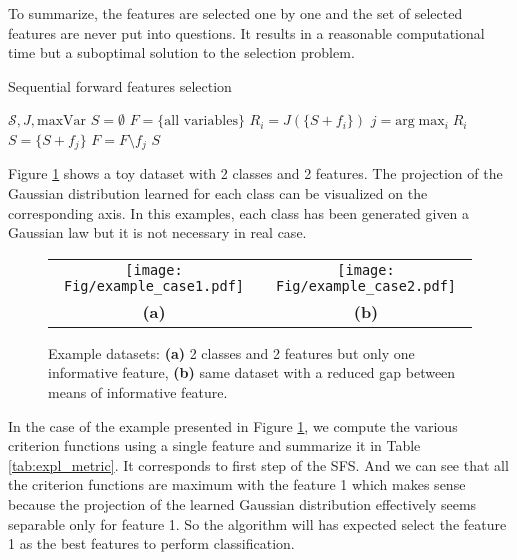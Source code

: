 \documentclass[a4paper,11pt,DIV=16]{scrartcl}
\begin{document}
    To summarize, the features are selected one by one and the set of selected features are never put into questions. It results in a reasonable computational time but a suboptimal solution to the selection problem.

    \begin{algorithm}
    \caption{Sequential forward features selection\label{alg:sfs}}
    \begin{algorithmic}[1]
    \REQUIRE $\mathcal{S},J,\text{maxVar}$
    \STATE $S=\emptyset$
    \STATE $F=\text{\{all variables\}}$
    \STATE $R_i = J(\{S + f_i\})$
    \ENDFOR
    \STATE $j=\text{arg} \max_{i} R_i$
    \STATE $S = \{S + f_j\}$
    \STATE $F = F \setminus f_j$
    \ENDWHILE
    \RETURN $S$
    \end{algorithmic}
    \end{algorithm}


    Figure \ref{fig:expl_dataset} shows a toy dataset with 2 classes and 2 features. The projection of the Gaussian distribution learned for each class can be visualized on the corresponding axis. In this examples, each class has been generated given a Gaussian law but it is not necessary in real case.

    \begin{figure}[!ht]
        \centering
        \begin{tabular}{cc}
            \texttt{[image: Fig/example\_case1.pdf]} &
            \texttt{[image: Fig/example\_case2.pdf]} \\
            {\bfseries{(a)}} & {\bfseries{(b)}} \\
        \end{tabular}
        \caption{Example datasets: {\bfseries{(a)}} 2 classes and 2 features but only one informative feature, {\bfseries{(b)}} same dataset with a reduced gap between means of informative feature.\label{fig:expl_dataset}}
    \end{figure}

    In the case of the example presented in Figure \ref{fig:expl_dataset}, we compute the various criterion functions using a single feature and summarize it in Table \ref{tab:expl_metric}. It corresponds to first step of the SFS. And we can see that all the criterion functions are maximum with the feature 1 which makes sense because the projection of the learned Gaussian distribution effectively seems separable only for feature 1. So the algorithm will has expected select the feature 1 as the best features to perform classification.
\end{document}
